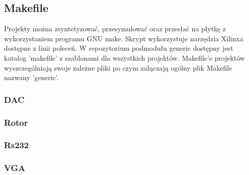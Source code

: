 \documentclass[a4paper,12pt]{article}
\begin{document}
\subsection{Makefile}

Projekty można zsyntetyzować, przesymulować oraz przesłać na płytkę z wykorzystaniem programu GNU make. Skrypt wykorzystuje narzędzia Xilinxa dostępne z linii poleceń. W repozytorium podmodułu generic dostępny jest katalog 'makefile' z szablonami dla wszystkich projektów. Makefile'e projektów wyszczególniają swoje zależne pliki po czym załączają ogólny plik Makefile nazwany 'generic'.






\subsubsection{DAC}


\subsubsection{Rotor}


\subsubsection{Rs232}


\subsubsection{VGA}



\linespread{1.3}
\selectfont
\end{document}
